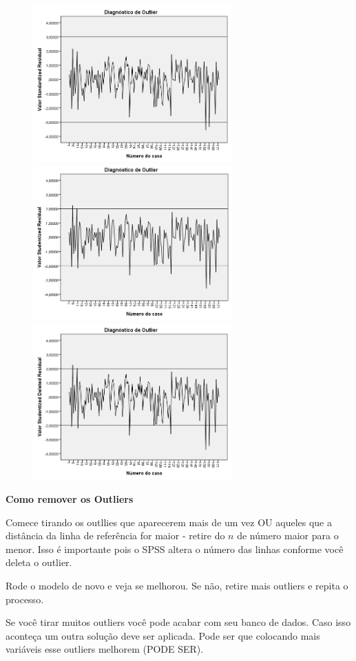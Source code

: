 		\begin{figure}[H]
			\centering
			\includegraphics[height=6cm]{images/rl_analise-outlier_ZRE}
			\includegraphics[height=6cm]{images/rl_analise-outlier_SRE}
			\includegraphics[height=6cm]{images/rl_analise-outlier_SRD}

		\end{figure}
			
		\textbf{Como remover os Outliers}

		\bigskip
				
		Comece tirando os outllies que aparecerem mais de um vez OU aqueles que a distância da linha de referência for maior - retire do $ n $ de número maior para o menor. Isso é importante pois o SPSS altera o número das linhas conforme você deleta o outlier.

		Rode o modelo de novo e veja se melhorou. Se não, retire mais outliers e repita o processo.

		Se você tirar muitos outliers você pode acabar com seu banco de dados. Caso isso aconteça um outra solução deve ser aplicada. Pode ser que colocando mais variáveis esse outliers melhorem (PODE SER).